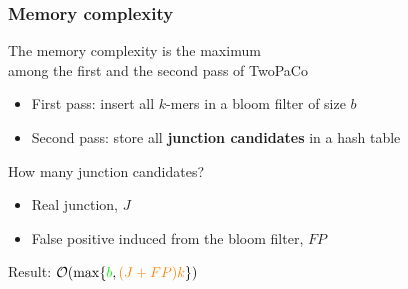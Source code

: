 \begin{frame}
  
	\frametitle{Memory complexity}

  \centering
	
	The memory complexity is the maximum \\ among the first and the second pass of TwoPaCo \\
	
	\medskip
	
	\begin{itemize}
	  \item[\textcolor{green}{\textbullet}] First pass: insert all $k$-mers in a bloom filter of size $b$
	  \item[\textcolor{orange}{\textbullet}] Second pass: store all \textbf{junction candidates} in a hash table
	\end{itemize}
	
	\medskip
	
	How many junction candidates?
	
	\begin{itemize}
	  \item Real junction, $J$
	  \item False positive induced from the bloom filter, $FP$
	\end{itemize}

	\medskip
	
	Result: $\mathcal{O}(\max\{{\color{green}b}, {\color{orange}(J+FP)k}\})$
	
	
\end{frame}



